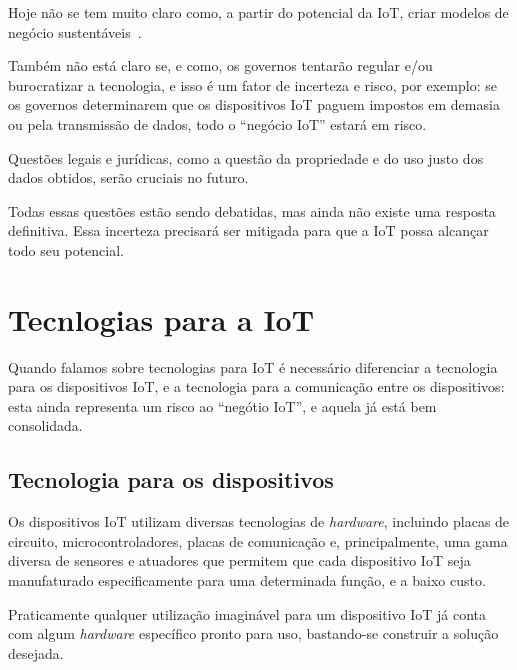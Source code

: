 \documentclass[pdftex, brazil, 12pt, twoside]{article}
\newcommand{\ingles}[1]{\textit{#1}}
\begin{document}
Hoje não se tem muito claro como, a partir do potencial da IoT, criar modelos
de negócio sustentáveis~\citep{IEEEIoTReport,UKGOSWalportIoT2014}.

Também não está claro se, e como, os governos tentarão regular e/ou burocratizar
a tecnologia, e isso é um fator de incerteza e risco, por exemplo: se os governos
determinarem que os dispositivos IoT paguem impostos em demasia ou pela
transmissão de dados, todo o ``negócio IoT'' estará em risco.

Questões legais e jurídicas, como a questão da propriedade e do uso justo
dos dados obtidos, serão cruciais no futuro.

Todas essas questões estão sendo debatidas, mas ainda não existe uma resposta
definitiva. Essa incerteza precisará ser mitigada para que a IoT possa alcançar
todo seu potencial.


\section{Tecnlogias para a IoT}
\label{tecnologia-iot}

Quando falamos sobre tecnologias para IoT é necessário diferenciar a tecnologia
para os dispositivos IoT, e a tecnologia para a comunicação entre os dispositivos:
esta ainda representa um risco ao ``negótio IoT'', e aquela já está bem consolidada.


\subsection{Tecnologia para os dispositivos}
\label{tecnologia-iot-dispositivos}

Os dispositivos IoT utilizam diversas tecnologias de \ingles{hardware}, incluindo
placas de circuito, microcontroladores, placas de comunicação e, principalmente,
uma gama diversa de sensores e atuadores que permitem que cada dispositivo IoT
seja manufaturado especificamente para uma determinada função, e a baixo custo.

Praticamente qualquer utilização imaginável para um dispositivo IoT já conta com
algum \ingles{hardware} específico pronto para uso, bastando-se construir a
solução desejada.
\end{document}

